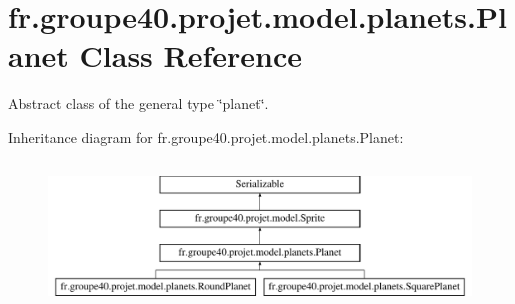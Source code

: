 \hypertarget{classfr_1_1groupe40_1_1projet_1_1model_1_1planets_1_1_planet}{}\section{fr.\+groupe40.\+projet.\+model.\+planets.\+Planet Class Reference}
\label{classfr_1_1groupe40_1_1projet_1_1model_1_1planets_1_1_planet}


Abstract class of the general type \char`\"{}planet\char`\"{}.  


Inheritance diagram for fr.\+groupe40.\+projet.\+model.\+planets.\+Planet\+:\begin{figure}[H]
\begin{center}
\leavevmode
\includegraphics[height=3.957597cm]{classfr_1_1groupe40_1_1projet_1_1model_1_1planets_1_1_planet}
\end{center}
\end{figure}
